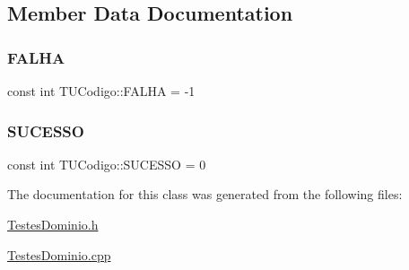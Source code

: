 \subsection{Member Data Documentation}
\mbox{\label{class_t_u_codigo_abff6dd7b04006df40462c76f8b769123}} 
\subsubsection{\texorpdfstring{F\+A\+L\+HA}{FALHA}}
{\footnotesize\ttfamily const int T\+U\+Codigo\+::\+F\+A\+L\+HA = -\/1\hspace{0.3cm}{\ttfamily [static]}}

\mbox{\label{class_t_u_codigo_ae74fd939ebced94047b47878406f53d1}} 
\subsubsection{\texorpdfstring{S\+U\+C\+E\+S\+SO}{SUCESSO}}
{\footnotesize\ttfamily const int T\+U\+Codigo\+::\+S\+U\+C\+E\+S\+SO = 0\hspace{0.3cm}{\ttfamily [static]}}



The documentation for this class was generated from the following files\+:\begin{DoxyCompactItemize}
\item 
\hyperlink{_testes_dominio_8h}{Testes\+Dominio.\+h}\item 
\hyperlink{_testes_dominio_8cpp}{Testes\+Dominio.\+cpp}\end{DoxyCompactItemize}
